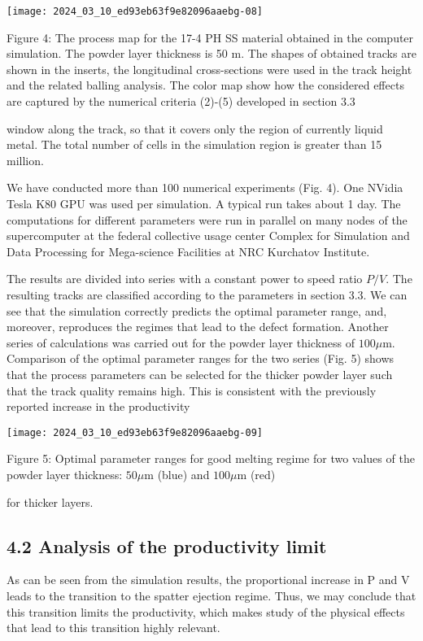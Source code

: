 \documentclass[10pt]{article}
\begin{document}
\begin{center}
\texttt{[image: 2024\_03\_10\_ed93eb63f9e82096aaebg-08]}
\end{center}

Figure 4: The process map for the 17-4 PH SS material obtained in the computer simulation. The powder layer thickness is 50 $\mathrm{m}$. The shapes of obtained tracks are shown in the inserts, the longitudinal cross-sections were used in the track height and the related balling analysis. The color map show how the considered effects are captured by the numerical criteria (2)-(5) developed in section 3.3

window along the track, so that it covers only the region of currently liquid metal. The total number of cells in the simulation region is greater than 15 million.

We have conducted more than 100 numerical experiments (Fig. 4). One NVidia Tesla K80 GPU was used per simulation. A typical run takes about 1 day. The computations for different parameters were run in parallel on many nodes of the supercomputer at the federal collective usage center Complex for Simulation and Data Processing for Mega-science Facilities at NRC Kurchatov Institute.

The results are divided into series with a constant power to speed ratio $P / V$. The resulting tracks are classified according to the parameters in section 3.3. We can see that the simulation correctly predicts the optimal parameter range, and, moreover, reproduces the regimes that lead to the defect formation. Another series of calculations was carried out for the powder layer thickness of $100 \mu \mathrm{m}$. Comparison of the optimal parameter ranges for the two series (Fig. 5) shows that the process parameters can be selected for the thicker powder layer such that the track quality remains high. This is consistent with the previously reported increase in the productivity

\begin{center}
\texttt{[image: 2024\_03\_10\_ed93eb63f9e82096aaebg-09]}
\end{center}

Figure 5: Optimal parameter ranges for good melting regime for two values of the powder layer thickness: $50 \mu \mathrm{m}$ (blue) and $100 \mu \mathrm{m}$ (red)

for thicker layers.

\subsection*{4.2 Analysis of the productivity limit}
As can be seen from the simulation results, the proportional increase in $\mathrm{P}$ and $\mathrm{V}$ leads to the transition to the spatter ejection regime. Thus, we may conclude that this transition limits the productivity, which makes study of the physical effects that lead to this transition highly relevant.
\end{document}
